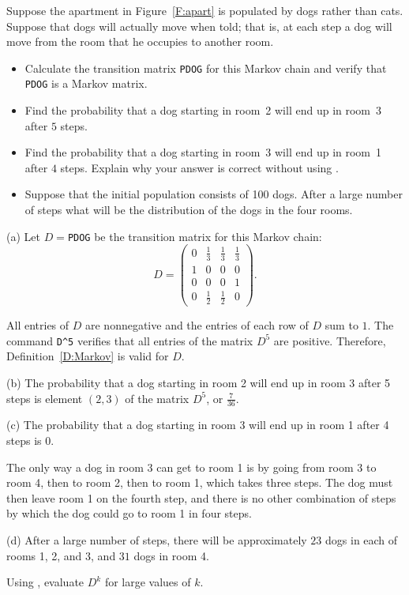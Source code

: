 \documentclass{ximera}
\begin{document}
\begin{exercise} \label{c4.10.5}
Suppose the apartment in Figure~\ref{F:apart} is populated by dogs rather than
cats.  Suppose that dogs will actually move when told; that is, at each step
a dog will move from the room that he occupies to another room.
\begin{itemize}
\item[(a)]  Calculate the transition matrix {\tt PDOG} for this Markov chain
and verify that {\tt PDOG} is a Markov matrix.
\item[(b)]  Find the probability that a dog starting in room~2 will end up in
room~3 after $5$ steps.
\item[(c)]  Find the probability that a dog starting in room~3 will end up in
room~1 after $4$ steps.  Explain why your answer is correct without using
\Matlabp.
\item[(d)]  Suppose that the initial population consists of 100 dogs.  After
a large number of steps what will be the distribution of the dogs in the four
rooms.
\end{itemize}

\begin{solution}

(a) \ans Let $D =${\tt PDOG} be the transition matrix for this Markov chain:
\[
D = \left(\begin{array}{rrrr} 0 & \frac{1}{3} & \frac{1}{3} &
\frac{1}{3} \\ 1 & 0 & 0 & 0 \\ 0 & 0 & 0 & 1 \\
0 & \frac{1}{2} & \frac{1}{2} & 0 \end{array}\right).
\]

\soln All entries of $D$ are nonnegative and the entries of each row of
$D$ sum to $1$.  The \Matlab command {\tt D\^{}5} verifies that all
entries of the matrix $D^5$ are positive.  Therefore,
Definition~\ref{D:Markov} is valid for $D$.

(b) The probability that a dog starting in room 2 will end up in room
3 after 5 steps is element $(2,3)$ of the matrix $D^5$, or
$\frac{7}{36}$.

(c) \ans The probability that a dog starting in room 3 will end up in room
1 after 4 steps is 0.

\soln The only way a dog in room 3 can get to room 1
is by going from room 3 to room 4, then to room 2, then to room 1, which
takes three steps.  The dog must then leave room 1 on the fourth step,
and there is no other combination of steps by which the dog could go to
room 1 in four steps.

(d) \ans After a large number of steps, there will be approximately $23$
dogs in each of rooms 1, 2, and 3, and $31$ dogs in room 4.

\soln Using \Matlab, evaluate $D^k$ for large values of $k$.

\end{solution}
\end{exercise}
\end{document}
